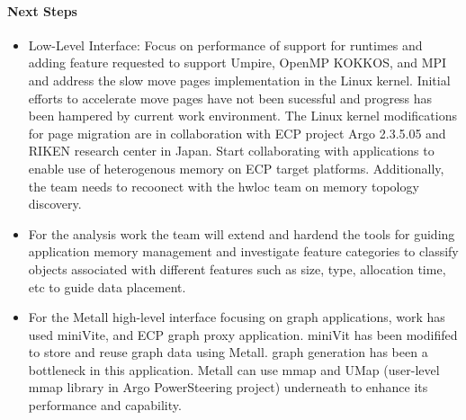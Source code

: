 \paragraph{Next Steps}
\begin{itemize}
\item  Low-Level Interface: Focus on performance of support for runtimes and adding feature requested to support Umpire, OpenMP KOKKOS, and MPI and address the slow move pages implementation in the Linux kernel. Initial efforts to accelerate move pages have not been sucessful and progress has been hampered by current work environment. The Linux kernel modifications for page migration are in collaboration with ECP project Argo 2.3.5.05 and RIKEN research center in Japan. Start collaborating with applications to enable use of heterogenous memory on ECP target platforms. Additionally, the team needs to recoonect with the hwloc team on memory topology discovery.
\item For the analysis work the team will extend and hardend the tools for guiding application memory management and investigate feature categories to classify objects associated with different features such as size, type, allocation time, etc to guide data placement.
\item For the Metall high-level interface focusing on graph applications, work has used miniVite, and ECP graph proxy application. miniVit has been modififed to store and reuse graph data using Metall. graph generation has been a bottleneck in this application. Metall can use mmap and UMap (user-level mmap library in Argo PowerSteering project) underneath to enhance its performance and capability.
\end{itemize}


